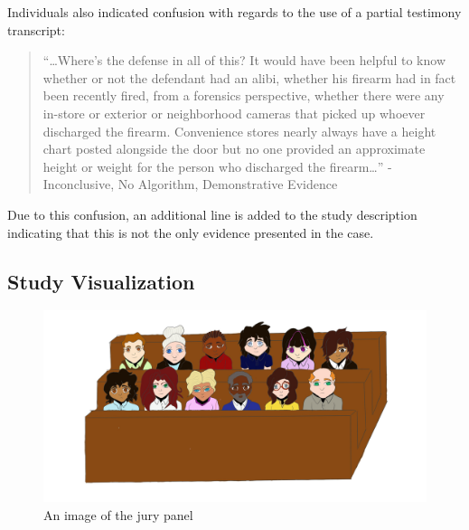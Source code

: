 \documentclass[print]{nuthesis}
\begin{document}
Individuals also indicated confusion with regards to the use of a partial testimony transcript:

\begin{quote}
``\ldots Where's the defense in all of this? It would have been helpful to know whether or not the defendant had an alibi, whether his firearm had in fact been recently fired, from a forensics perspective, whether there were any in-store or exterior or neighborhood cameras that picked up whoever discharged the firearm. Convenience stores nearly always have a height chart posted alongside the door but no one provided an approximate height or weight for the person who discharged the firearm\ldots{}'' - Inconclusive, No Algorithm, Demonstrative Evidence
\end{quote}

Due to this confusion, an additional line is added to the study description indicating that this is not the only evidence presented in the case.

\hypertarget{study-visualization}{%
\subsection{Study Visualization}\label{study-visualization}}

\begin{figure}

{\centering \includegraphics[width=\linewidth]{images/Jury} 

}

\caption{An image of the jury panel}\label{fig:jurypanel}
\end{figure}
\end{document}
